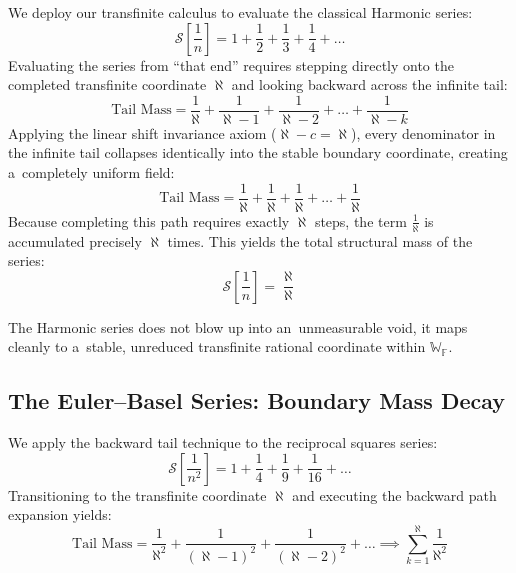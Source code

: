 \documentclass[11pt,a4paper]{article}
\theoremstyle{definition}
\theoremstyle{noperiod}
\begin{document}
We deploy our transfinite calculus to evaluate the classical Harmonic series:
\begin{equation}
\mathcal{S}\left[\frac{1}{n}\right] = 1 + \frac{1}{2} + \frac{1}{3} + \frac{1}{4} + \dots
\end{equation}
Evaluating the series from ``that end'' requires stepping directly onto the completed transfinite coordinate $\aleph$ and looking backward across the infinite tail:
\begin{equation}
\text{Tail Mass} = \frac{1}{\aleph} + \frac{1}{\aleph-1} + \frac{1}{\aleph-2} + \dots + \frac{1}{\aleph-k}
\end{equation}
Applying the linear shift invariance axiom ($\aleph - c = \aleph$), every denominator in the infinite tail collapses identically into the stable boundary coordinate, creating a~completely uniform field:\begin{equation}
\text{Tail Mass} = \frac{1}{\aleph} + \frac{1}{\aleph} + \frac{1}{\aleph} + \dots + \frac{1}{\aleph}
\end{equation}
Because completing this path requires exactly $\aleph$ steps, the term $\frac{1}{\aleph}$ is accumulated precisely $\aleph$ times. This yields the total structural mass of the series:
\begin{equation}
\mathcal{S}\left[\frac{1}{n}\right] = \frac{\aleph}{\aleph}
\end{equation}

The Harmonic series does not blow up into an~unmeasurable void, it maps cleanly to a~stable, unreduced transfinite rational coordinate within $\mathbb{W}_{\mathbb{F}}$.

\subsection{The Euler--Basel Series: Boundary Mass Decay}

We apply the backward tail technique to the reciprocal squares series:
\begin{equation}
\mathcal{S}\left[\frac{1}{n^2}\right] = 1 + \frac{1}{4} + \frac{1}{9} + \frac{1}{16} + \dots
\end{equation}
Transitioning to the transfinite coordinate $\aleph$ and executing the backward path expansion yields:
\begin{equation}
\text{Tail Mass} = \frac{1}{\aleph^2} + \frac{1}{(\aleph-1)^2} + \frac{1}{(\aleph-2)^2} + \dots \implies \sum_{k=1}^{\aleph} \frac{1}{\aleph^2}
\end{equation}
\end{document}
